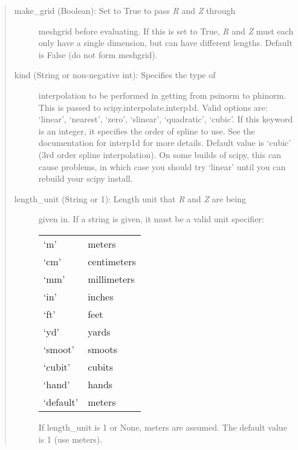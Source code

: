 \documentclass[letterpaper,10pt,english]{sphinxmanual}
\begin{document}
\begin{fulllineitems}
\begin{fulllineitems}
\begin{quote}
\begin{description}
\begin{description}
\item[{make\_grid (Boolean): Set to True to pass \emph{R} and \emph{Z} through}] \leavevmode
meshgrid before evaluating. If this is set to True, \emph{R} and \emph{Z}
must each only have a single dimension, but can have different
lengths.  Default is False (do not form meshgrid).

\item[{kind (String or non-negative int): Specifies the type of}] \leavevmode
interpolation to be performed in getting from psinorm to
phinorm. This is passed to scipy.interpolate.interp1d. Valid
options are: `linear', `nearest', `zero', `slinear',
`quadratic', `cubic'.  If this keyword is an integer, it
specifies the order of spline to use. See the documentation for
interp1d for more details.  Default value is `cubic' (3rd order
spline interpolation). On some builds of scipy, this can cause
problems, in which case you should try `linear' until you can
rebuild your scipy install.

\item[{length\_unit (String or 1): Length unit that \emph{R} and \emph{Z} are being}] \leavevmode
given in. If a string is given, it must be a valid unit
specifier:

\begin{tabulary}{\linewidth}{|L|L|}
\hline

`m'
 & 
meters
\\

`cm'
 & 
centimeters
\\

`mm'
 & 
millimeters
\\

`in'
 & 
inches
\\

`ft'
 & 
feet
\\

`yd'
 & 
yards
\\

`smoot'
 & 
smoots
\\

`cubit'
 & 
cubits
\\

`hand'
 & 
hands
\\

`default'
 & 
meters
\\
\hline\end{tabulary}


If length\_unit is 1 or None, meters are assumed. The default
value is 1 (use meters).


\end{description}
\end{description}
\end{quote}
\end{fulllineitems}
\end{fulllineitems}
\end{document}
